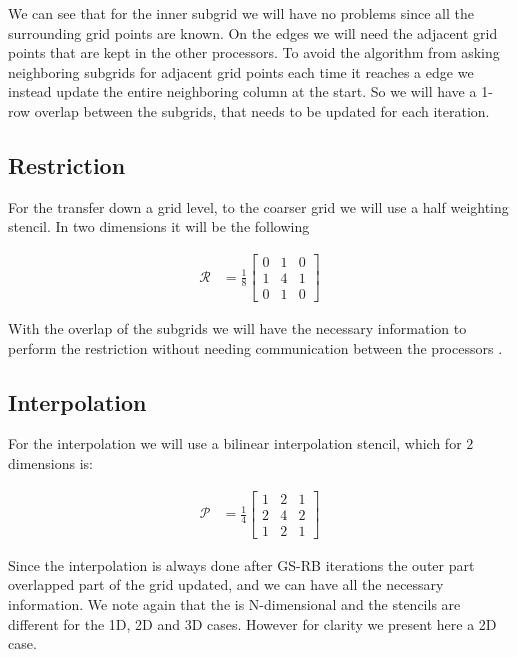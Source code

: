 		We can see that for the inner subgrid we will have no problems since
		all the surrounding grid points are known. On the edges we will need the adjacent
		grid points that are kept in the other processors. To avoid the algorithm
		from asking neighboring subgrids for adjacent grid points each time it
		reaches a edge we instead update the entire neighboring column at the start.
		So we will have a 1-row overlap between the subgrids, that needs to be updated
		for each iteration.

	\subsection{Restriction}
		For the transfer down a grid level, to the coarser grid we will use a half
		weighting stencil. In two dimensions it will be the following

		\begin{align}
			\mathcal{R} &= \frac{1}{8}
			\begin{bmatrix}
				0 & 1 & 0
				\\
				1 & 4 & 1
				\\
				0 & 1 & 0
			\end{bmatrix}
		\end{align}

		With the overlap of the subgrids we will have the necessary information to
		perform the restriction without needing communication between the processors
		\citep{hackbusch_multigrid_1982}.

	\subsection{Interpolation}
		For the interpolation we will use a bilinear interpolation stencil,
		which for \(2\) dimensions is:

		\begin{align}
			\mathcal{P} &= \frac{1}{4}
			\begin{bmatrix}
				1 & 2 & 1
				\\
				2 & 4 & 2
				\\
				1 & 2 & 1
			\end{bmatrix}
		\end{align}

		Since the interpolation is always done after GS-RB iterations the outer
		part overlapped part of the grid updated, and we can have all the necessary
		information. We note again that the is N-dimensional and the stencils are different for the
		1D, 2D and 3D cases. However for clarity we present here a 2D case.

